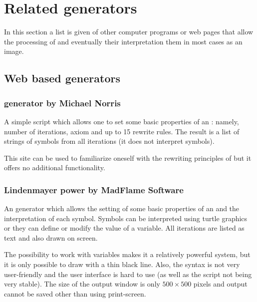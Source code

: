 
\section{Related \lsystem generators}

In this section a list is given of other computer programs or web pages that allow the processing of \lsystems and eventually their interpretation them in most cases as an image.

\subsection{Web based generators}
\label{sec:WebBasedGenerators}

\subsubsection{\lsystem generator by Michael Norris}

\noindent
A simple script which allows one to set some basic properties of an \lsystem: namely, number of iterations, axiom and up to 15 rewrite rules.
The result is a list of strings of symbols from all iterations (it does not interpret symbols).

This site can be used to familiarize oneself with the rewriting principles of \lsystems but it offers no additional functionality.


\subsubsection{Lindenmayer power by MadFlame Software}

\noindent
An \lsystem generator which allows the setting of some basic properties of an \lsystem and the interpretation of each symbol.
Symbols can be interpreted using turtle graphics or they can define or modify the value of a variable.
All iterations are listed as text and also drawn on screen.

The possibility to work with variables makes it a relatively powerful system, but it is only possible to draw with a thin black line.
Also, the syntax is not very user-friendly and the user interface is hard to use (as well as the script not being very stable).
The size of the output window is only $500 \times 500$ pixels and output cannot be saved other than using print-screen.


